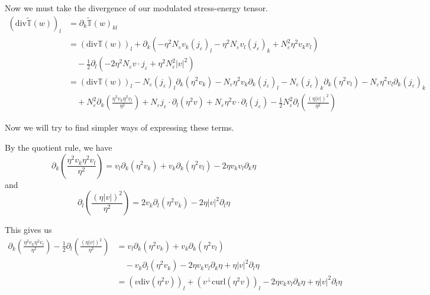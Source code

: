 \documentclass[a4paper]{article}
\newcommand{\curl}{\mathrm{curl}}
\renewcommand{\div}{\mathrm{div}}
\begin{document}
Now we must take the divergence of our modulated stress-energy tensor.
\begin{align}
  ( \div \tilde{\mathbb{T}}(w) )_l &= \partial_k \tilde{\mathbb{T}}(w)_{kl} \nonumber \\
  &= ( \div \mathbb{T}(w) )_l + \partial_k \left( - \eta^2 N_\varepsilon v_k (j_\varepsilon)_l - \eta^2 N_\varepsilon v_l (j_\varepsilon)_k +
  N_\varepsilon^2 \eta^2 v_k v_l \right) \nonumber \\
  &\quad - \frac{1}{2} \partial_l ( -2 \eta^2 N_\varepsilon v \cdot j_\varepsilon + \eta^2 N_\varepsilon^2 |v|^2 ) \nonumber \\
  &= (\div \mathbb{T}(w))_l - N_\varepsilon (j_\varepsilon)_l \partial_k (\eta^2 v_k) - N_\varepsilon \eta^2 v_k \partial_k ( j_\varepsilon )_l -
  N_\varepsilon (j_\varepsilon)_k \partial_k (\eta^2 v_l) - N_\varepsilon \eta^2 v_l \partial_k (j_\varepsilon)_k \nonumber \\
  &\quad + N_\varepsilon^2 \partial_k \left( \frac{\eta^2 v_k \eta^2 v_l}{\eta^2} \right) + N_\varepsilon j_\varepsilon \cdot \partial_l (\eta^2 v) +
  N_\varepsilon \eta^2 v \cdot \partial_l (j_\varepsilon) - \frac{1}{2} N_\varepsilon^2 \partial_l \left( \frac{(\eta |v|)^2}{\eta^2} \right)
  \label{eqn:div_mod_stress_energy1}
\end{align}

Now we will try to find simpler ways of expressing these terms.

By the quotient rule, we have
\begin{equation}
  \partial_k \left( \frac{\eta^2 v_k \eta^2 v_l}{\eta^2} \right) = v_l \partial_k (\eta^2 v_k) + v_k \partial_k(\eta^2 v_l) - 2 \eta v_k v_l
  \partial_k \eta
  \label{eqn:quot_rule1}
\end{equation}
and
\begin{equation}
  \partial_l \left( \frac{(\eta |v|)^2}{\eta^2} \right) = 2 v_k \partial_l (\eta^2 v_k) - 2 \eta |v|^2 \partial_l \eta
  \label{eqn:quot_rule2}
\end{equation}

This gives us
\begin{align}
  \partial_k \left( \frac{\eta^2 v_k \eta^2 v_l}{\eta^2} \right) - \frac{1}{2} \partial_l \left( \frac{(\eta |v|)^2}{\eta^2} \right) &= v_l \partial_k (\eta^2
  v_k) + v_k \partial_k( \eta^2 v_l ) \nonumber \\
  &\quad - v_k \partial_l (\eta^2 v_k) - 2 \eta v_k v_l \partial_k \eta + \eta |v|^2 \partial_l \eta \nonumber \\
  &= (v \div( \eta^2 v ) )_l + (v^\perp \curl( \eta^2 v) )_l - 2 \eta v_k v_l \partial_k \eta + \eta |v|^2 \partial_l \eta
  \label{eqn:quot_rules}
\end{align}
\end{document}
